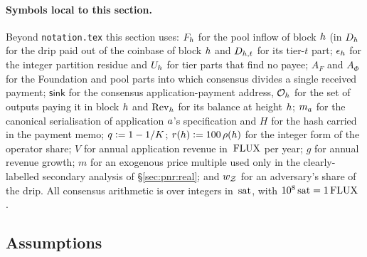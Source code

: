 \paragraph{Symbols local to this section.}
Beyond \texttt{notation.tex} this section uses: $F_{h}$ for the pool inflow of block $h$ (in
 $D_{h}$ for the drip paid
out of the coinbase of block $h$ and $D_{h,t}$ for its tier-$t$ part; $\epsilon_{h}$ for the
integer partition residue and $U_{h}$ for tier parts that find no payee; $A_F$ and $A_\Phi$ for the
Foundation and pool parts into which consensus divides a single received payment; $\mathsf{sink}$
for the consensus application-payment address, $\mathcal{O}_{h}$ for the set of outputs paying it in
block $h$ and $\mathrm{Rev}_{h}$ for its balance at height $h$; $m_{a}$ for the canonical
serialisation of application $a$'s specification and $H$ for the hash carried in the payment memo;
$q \vcentcolon= 1 - 1/K$; $r(h) \vcentcolon= 100\,\rho(h)$ for the integer form of the operator
share; $V$ for annual application revenue in $\,\mathrm{FLUX}$ per year; $g$ for annual revenue growth; $m$
for an exogenous price multiple used only in the clearly-labelled secondary analysis of
\S\ref{sec:pnr:real}; and $w_{\mathcal{Z}}$ for an adversary's share of the drip. All consensus arithmetic
is over integers in $\,\mathrm{sat}$, with $10^{8}\,\mathrm{sat} = 1\,\mathrm{FLUX}$
.

\subsection{Assumptions}
\label{sec:pnr:assumptions}

